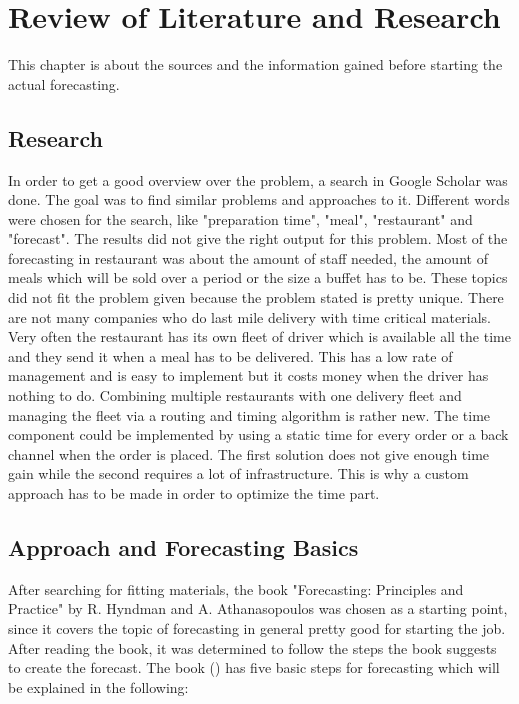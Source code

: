 \renewcommand{\thepage}{\arabic{page}}
\chapter{Review of Literature and Research}\label{chapter:Review of Literature and Research}
This chapter is about the sources and the information gained before starting the actual forecasting.
\section{Research}\label{section:Research}
In order to get a good overview over the problem, a search in Google Scholar was done. The goal was to find similar problems and approaches to it. Different words were chosen for the search, like "preparation time", "meal", "restaurant" and "forecast". The results did not give the right output for this problem. Most of the forecasting in restaurant was about the amount of staff needed, the amount of meals which will be sold over a period or the size a buffet has to
be. These topics did not fit the problem given because the problem stated is pretty unique. There are not many companies who do last mile delivery with time critical materials. Very often the restaurant has its own fleet of driver which is available all the time and they send it when a meal has to be delivered. This has a low rate of management and is easy to implement but it costs money when the driver has nothing to do. Combining multiple restaurants with one delivery fleet and managing the fleet via a routing and timing algorithm is rather new. The time component could be implemented by using a static time for every order or a back channel when the order is placed. The first solution does not give enough time gain while the second requires a lot of infrastructure. This is why a custom approach has to be made in order to optimize the time part.
\section{Approach and Forecasting Basics}\label{section:Approach and Basics}
After searching for fitting materials, the book "Forecasting: Principles and Practice" by R. Hyndman and A. Athanasopoulos was chosen as a starting point, since it covers the topic of forecasting in general pretty good for starting the job. After reading the book, it was determined to follow the steps the book suggests to create the forecast. The book (\cite{Hyndman.2013}) has five basic steps for forecasting which will be explained in the following:

